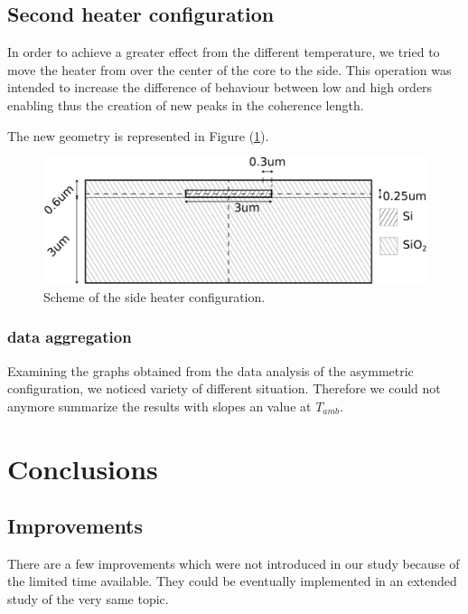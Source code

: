 \documentclass[12pt,a4paper,twoside]{article}
\begin{document}
\subsection{Second heater configuration}
In order to achieve a greater effect from the different temperature, we tried to move the heater from over the center of the core to the side.
This operation was intended to increase the difference of behaviour between low and high orders enabling thus the creation of new peaks in the coherence length.

The new geometry is represented in Figure (\ref{fig_geometry_asym}).
\begin{figure}[!ht]
	\centering
	\includegraphics[width=1\textwidth]{geometry2.pdf}
	\caption{Scheme of the side heater configuration.}
	\label{fig_geometry_asym}
\end{figure}

\subsubsection{data aggregation}
Examining the graphs obtained from the data analysis of the asymmetric configuration, we noticed variety of different situation.
Therefore we could not anymore summarize the results with slopes an value at $T_{amb}$.


\section{Conclusions}
\subsection{Improvements}

There are a few improvements which were not introduced in our study because of the limited time available.
They could be eventually implemented in an extended study of the very same topic.
\end{document}
